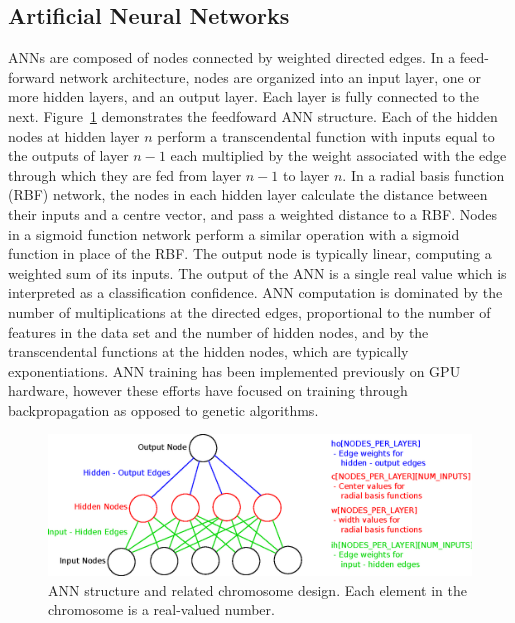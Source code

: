 \documentclass[11pt]{article}       %
\begin{document}
\subsection{Artificial Neural Networks} \label{ann}
ANNs are composed of nodes connected by weighted directed edges. In a feed-forward network architecture, nodes are organized into an input layer, one or more hidden layers, and an output layer. Each layer is fully connected to the next. Figure~\ref{fig:ann-chromosome} demonstrates the feedfoward ANN structure. Each of the hidden nodes at hidden layer $n$ perform a transcendental function with inputs equal to the outputs of layer $n-1$ each multiplied by the weight associated with the edge through which they are fed from layer $n-1$ to layer $n$. In a radial basis function (RBF) network, the nodes in each hidden layer calculate the distance between their inputs and a centre vector, and pass a weighted distance to a RBF. Nodes in a sigmoid function network perform a similar operation with a sigmoid function in place of the RBF. The output node is typically linear, computing a weighted sum of its inputs. The output of the ANN is a single real value which is interpreted as a classification confidence. ANN computation is dominated by the number of multiplications at the directed edges, proportional to the number of features in the data set and the number of hidden nodes, and by the transcendental functions at the hidden nodes, which are typically exponentiations.  ANN training has been implemented previously on GPU hardware, however these efforts have focused on training through backpropagation \cite{backprop} as opposed to genetic algorithms.

\begin{figure}[h]
	\centering
	\includegraphics[width=\textwidth]{ann-chromosome}
	\caption{ANN structure and related chromosome design.  Each element in the chromosome is a real-valued number.}
	\label{fig:ann-chromosome}
\end{figure}
\end{document}
